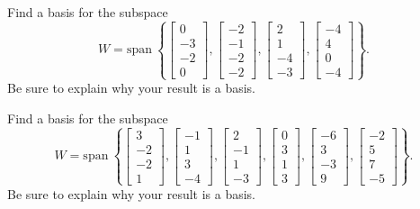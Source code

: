 \documentclass{article}
\begin{document}
\begin{exerciseStatement}
    Find a basis for the subspace
\[W=\mathrm{span}\ \left\{\left[\begin{array}{r}
0 \\
-3 \\
-2 \\
0
\end{array}\right] , \left[\begin{array}{r}
-2 \\
-1 \\
-2 \\
-2
\end{array}\right] , \left[\begin{array}{r}
2 \\
1 \\
-4 \\
-3
\end{array}\right] , \left[\begin{array}{r}
-4 \\
4 \\
0 \\
-4
\end{array}\right]\right\}.\]
 Be sure to explain why your result is a basis.


  
\end{exerciseStatement}

\begin{exerciseStatement}
    Find a basis for the subspace
\[W=\mathrm{span}\ \left\{\left[\begin{array}{r}
3 \\
-2 \\
-2 \\
1
\end{array}\right] , \left[\begin{array}{r}
-1 \\
1 \\
3 \\
-4
\end{array}\right] , \left[\begin{array}{r}
2 \\
-1 \\
1 \\
-3
\end{array}\right] , \left[\begin{array}{r}
0 \\
3 \\
1 \\
3
\end{array}\right] , \left[\begin{array}{r}
-6 \\
3 \\
-3 \\
9
\end{array}\right] , \left[\begin{array}{r}
-2 \\
5 \\
7 \\
-5
\end{array}\right]\right\}.\]
 Be sure to explain why your result is a basis.


  
\end{exerciseStatement}
\end{document}
